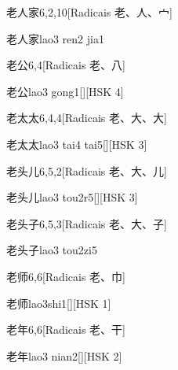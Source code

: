\begin{entry}{老人家}{6,2,10}[Radicais ⽼、⼈、⼧]
  \begin{phonetics}{老人家}{lao3 ren2 jia1}
  \end{phonetics}
\end{entry}

\begin{entry}{老公}{6,4}[Radicais ⽼、⼋]
  \begin{phonetics}{老公}{lao3 gong1}[][HSK 4]
  \end{phonetics}
\end{entry}

\begin{entry}{老太太}{6,4,4}[Radicais ⽼、⼤、⼤]
  \begin{phonetics}{老太太}{lao3 tai4 tai5}[][HSK 3]
  \end{phonetics}
\end{entry}

\begin{entry}{老头儿}{6,5,2}[Radicais ⽼、⼤、⼉]
  \begin{phonetics}{老头儿}{lao3 tou2r5}[][HSK 3]
  \end{phonetics}
\end{entry}

\begin{entry}{老头子}{6,5,3}[Radicais ⽼、⼤、⼦]
  \begin{phonetics}{老头子}{lao3 tou2zi5}
  \end{phonetics}
\end{entry}

\begin{entry}{老师}{6,6}[Radicais ⽼、⼱]
  \begin{phonetics}{老师}{lao3shi1}[][HSK 1]
  \end{phonetics}
\end{entry}

\begin{entry}{老年}{6,6}[Radicais ⽼、⼲]
  \begin{phonetics}{老年}{lao3 nian2}[][HSK 2]
  \end{phonetics}
\end{entry}

